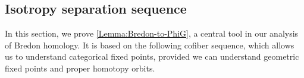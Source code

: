 \documentclass[11pt]{amsart}
\makeatletter
\newtheorem{lemma}[equation]{Lemma}
\newtheorem{proposition}[equation]{Proposition}
\theoremstyle{definition}
\newtheorem{remark}[equation]{Remark}
\numberwithin{equation}{subsection} %
\def\cp{\mathcal{P}}
\newcommand{\switchmargin}{
\if@reversemargin
\normalmarginpar
\else
\reversemarginpar
\fi
}
\newcommand{\EvaNote}[1]
   {\marginpar{\raggedright\smaller \smaller \color{teal}#1}\switchmargin}
\makeatother
\begin{document}







\subsection{Isotropy separation sequence}\label{SS:ISS}

In this section, we prove \cref{Lemma:Bredon-to-PhiG}, a central tool in our analysis of Bredon homology. It is based on the following cofiber sequence, which allows us to understand categorical fixed points, provided we can understand geometric fixed points and proper homotopy orbits.
\end{document}

